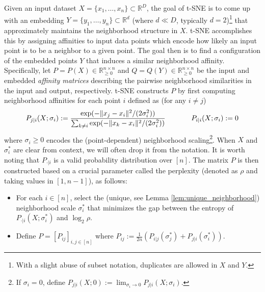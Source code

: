 Given an input dataset \(X = \{x_1,\ldots, x_n\}\subset \mathbb{R}^{D}\), the goal of t-SNE is to come up with an embedding \(Y = \{y_1,\ldots,y_n\}\subset \mathbb{R}^{d}\) (where \(d\ll D\), typically \(d=2\))\footnote{With a slight abuse of subset notation, duplicates are allowed in $X$ and $Y$.} that approximately maintains the neighborhood structure in $X$. t-SNE accomplishes this by assigning affinities to input data points which encode how likely an input point is to be a neighbor to a given point. The goal then is to find a configuration of the embedded points $Y$ that induces a similar neighborhood affinity. 
Specifically, let \(P = P(X) \in \mathbb{R}_{\geq 0}^{n\times n}\) and \(Q = Q(Y) \in \mathbb{R}_{\geq 0}^{n\times n}\) be the input and embedded
\textit{affinity matrices} describing the pairwise neighborhood similarities in the input and output, respectively. t-SNE constructs \(P\) 
by first computing neighborhood affinities for each point $i$ defined as (for any $i\neq j$)
\begin{equation}
    P_{j|i}(X; \sigma_i) := \frac{\exp(-\lVert x_j-x_i\rVert^2/(2\sigma_i^2))}{\sum_{k\neq i} \exp(-\lVert x_k -x_i\rVert^2/(2\sigma_i^2))} 
    \hspace{0.5in} P_{i|i}(X; \sigma_i):=0
    \label{eq:tsne_p}
\end{equation}
where $\sigma_i \geq 0$ encodes the (point-dependent) neighborhood scaling\footnote{If $\sigma_i=0$, define $P_{j|i}(X;0) := \lim_{\sigma_i \to 0} P_{j|i}(X;\sigma_i)$.%
}. When $X$ and $\sigma_i^*$ are clear from context, we will often drop it from the notation. It is worth noting that $P_{\cdot|i}$ is a valid probability distribution over $[n]$.
The matrix \(P\) is then constructed based on a crucial parameter called the perplexity (denoted as \(\rho\) and taking values in %
\([1,n-1]\)), as follows: 
\begin{itemize}
    \item[(1)] For each $i \in [n]$, select the (unique, see Lemma \ref{lem:unique_neighborhood}) neighborhood scale \(\sigma_i^*\) that minimizes the gap between the entropy of \(P_{\cdot | i}(X;\sigma^*_i)\) and \(\log_2 \rho\). %
    \item[(2)] Define \(P =  [P_{ij}]_{i,j\in [n]}\) where \(P_{ij} := \frac{1}{2n}(P_{i|j}(\sigma^*_j) + P_{j|i}(\sigma^*_i))\).%
\end{itemize}
